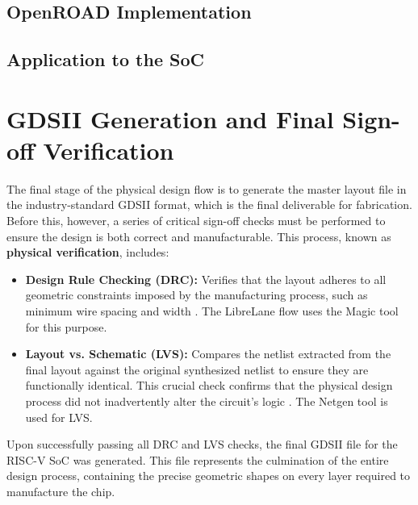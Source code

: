 \subsection{OpenROAD Implementation}

\subsection{Application to the SoC}

\section{GDSII Generation and Final Sign-off Verification}
\label{sec:final_verification}


The final stage of the physical design flow is to generate the master layout file in the industry-standard GDSII format, which is the final deliverable for fabrication. Before this, however, a series of critical sign-off checks must be performed to ensure the design is both correct and manufacturable. This process, known as \textbf{physical verification}, includes:

\begin{itemize}
    \item \textbf{Design Rule Checking (DRC):} Verifies that the layout adheres to all geometric constraints imposed by the manufacturing process, such as minimum wire spacing and width \cite{vlsi-springer}. The LibreLane flow uses the Magic tool for this purpose.
    \item \textbf{Layout vs. Schematic (LVS):} Compares the netlist extracted from the final layout against the original synthesized netlist to ensure they are functionally identical. This crucial check confirms that the physical design process did not inadvertently alter the circuit's logic \cite{vlsi-springer}. The Netgen tool is used for LVS.
\end{itemize}

Upon successfully passing all DRC and LVS checks, the final GDSII file for the RISC-V SoC was generated. This file represents the culmination of the entire design process, containing the precise geometric shapes on every layer required to manufacture the chip.

